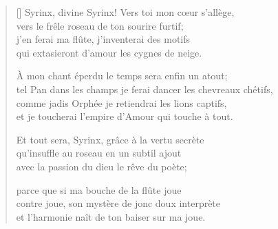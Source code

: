 



\settowidth{\versewidth}{tel Pan dans les champs je ferai dancer les chevreaux chétifs,}

\bigskip

\begin{verse}[\versewidth]
Syrinx, divine Syrinx! Vers toi mon c{\oe}ur s'allège, \\
vers le frêle roseau de ton sourire furtif; \\
j'en ferai ma flûte, j'inventerai des motifs \\
qui extasieront d'amour les cygnes de neige.

À mon chant éperdu le temps sera enfin un atout; \\
tel Pan dans les champs je ferai dancer les chevreaux chétifs, \\
comme jadis Orphée je retiendrai les lions captifs, \\
et je toucherai l'empire d'Amour qui touche à tout.

Et tout sera, Syrinx, grâce à la vertu secrète \\
qu'insuffle au roseau en un subtil ajout \\
avec la passion du dieu le rêve du poète;

parce que si ma bouche de la flûte joue \\
contre joue, son mystère de jonc doux interprète \\
et l'harmonie naît de ton baiser sur ma joue.
\end{verse}

\newpage



\settowidth{\versewidth}{!`Syrinx, divina Syrinx! Buscar quiero la leve}

\bigskip

